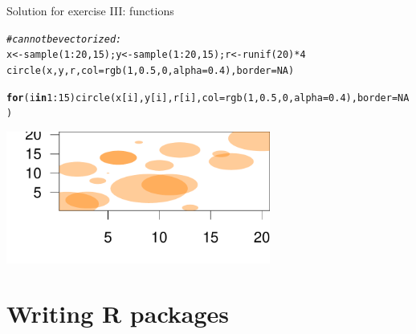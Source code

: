 \documentclass[xcolor=table,      handout ,    xcolor=dvipsnames]{beamer}\usepackage[]{graphicx}\usepackage[]{color}
\makeatletter
\newcommand{\hlnum}[1]{\textcolor[rgb]{0,0,0}{#1}}
\newcommand{\hlcom}[1]{\textcolor[rgb]{0,0.392,0}{\textit{#1}}}
\newcommand{\hlopt}[1]{\textcolor[rgb]{0,0,0}{#1}}
\newcommand{\hlstd}[1]{\textcolor[rgb]{0,0,0}{#1}}
\newcommand{\hlkwa}[1]{\textcolor[rgb]{1,0,0}{\textbf{#1}}}
\newcommand{\hlkwb}[1]{\textcolor[rgb]{0,0,0}{#1}}
\newcommand{\hlkwc}[1]{\textcolor[rgb]{1,0,1}{#1}}
\newcommand{\hlkwd}[1]{\textcolor[rgb]{0,0,1}{#1}}
\newenvironment{kframe}{%
 \def\at@end@of@kframe{}%
 \ifinner\ifhmode%
  \def\at@end@of@kframe{\end{minipage}}%
  \begin{minipage}{\columnwidth}%
 \fi\fi%
 \def\FrameCommand##1{\hskip\@totalleftmargin \hskip-\fboxsep
 \colorbox{shadecolor}{##1}\hskip-\fboxsep
     \hskip-\linewidth \hskip-\@totalleftmargin \hskip\columnwidth}%
 \MakeFramed {\advance\hsize-\width
   \@totalleftmargin\z@ \linewidth\hsize
   \@setminipage}}%
 {\par\unskip\endMakeFramed%
 \at@end@of@kframe}
\newenvironment{knitrout}{}{} %
\newcounter{exercisecount}
\makeatother
\begin{document}
\begin{frame}[fragile]{Solution for exercise  III: functions}
\begin{knitrout}\scriptsize
{}\color{fgcolor}\begin{kframe}
\begin{alltt}
\hlcom{# can not be vectorized:}
\hlstd{x} \hlkwb{<-} \hlkwd{sample}\hlstd{(}\hlnum{1}\hlopt{:}\hlnum{20}\hlstd{,} \hlnum{15}\hlstd{) ;  y} \hlkwb{<-} \hlkwd{sample}\hlstd{(}\hlnum{1}\hlopt{:}\hlnum{20}\hlstd{,} \hlnum{15}\hlstd{) ; r} \hlkwb{<-} \hlkwd{runif}\hlstd{(}\hlnum{20}\hlstd{)}\hlopt{*}\hlnum{4}
\hlkwd{circle}\hlstd{(x,y,r,} \hlkwc{col}\hlstd{=}\hlkwd{rgb}\hlstd{(}\hlnum{1}\hlstd{,}\hlnum{0.5}\hlstd{,}\hlnum{0}\hlstd{,}\hlkwc{alpha}\hlstd{=}\hlnum{0.4}\hlstd{),} \hlkwc{border}\hlstd{=}\hlnum{NA}\hlstd{)}
\end{alltt}


{\ttfamily\noindent\color{warningcolor}{\#\# Warning in circle(x, y, r, col = rgb(1, 0.5, 0, alpha = 0.4), border = NA): Only the first element of the vectors is used.}}\begin{alltt}
\hlkwa{for}\hlstd{(i} \hlkwa{in} \hlnum{1}\hlopt{:}\hlnum{15}\hlstd{)} \hlkwd{circle}\hlstd{(x[i],y[i],r[i],} \hlkwc{col}\hlstd{=}\hlkwd{rgb}\hlstd{(}\hlnum{1}\hlstd{,}\hlnum{0.5}\hlstd{,}\hlnum{0}\hlstd{,}\hlkwc{alpha}\hlstd{=}\hlnum{0.4}\hlstd{),} \hlkwc{border}\hlstd{=}\hlnum{NA}\hlstd{)}
\end{alltt}
\end{kframe}

{\centering \includegraphics[width=0.65\textwidth]{./fig/exfunsolc-1} 

}



\end{knitrout}
\end{frame}


\section{Writing R packages}
\end{document}
